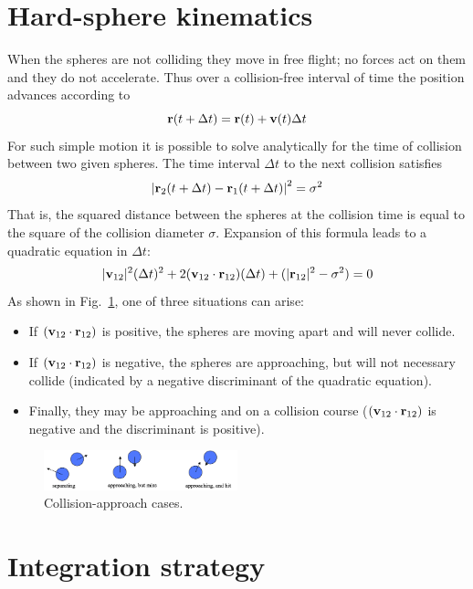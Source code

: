 \documentclass[9pt,bestpractices]{molsim}
\begin{document}
\section{Hard-sphere kinematics}\label{hard-sphere-kinematics}

When the spheres are not colliding they move in free flight; no forces
act on them and they do not accelerate. Thus over a collision-free
interval of time the position advances according to
\[{\bf{r}}(t + \Delta t) = {\bf{r}}(t) + {\bf{v}}(t)\Delta t\]
For such simple motion it is possible to solve analytically for the time
of collision between two given spheres. The time interval $\Delta t$ to the next
collision satisfies
\[{\left| {{{\bf{r}}_2}(t + \Delta t) - {{\bf{r}}_1}(t + \Delta t)} \right|^2} = {\sigma ^2}\]
That is, the squared distance between the spheres at the collision time
is equal to the square of the collision diameter $\sigma$.
Expansion of this formula leads to
a quadratic equation in $\Delta t$:
\[|{{\bf{v}}_{12}}{|^2}{(\Delta t)^2} + 2({{\bf{v}}_{12}} \cdot {{\bf{r}}_{12}})(\Delta t) + (|{{\bf{r}}_{12}}{|^2} - {\sigma ^2}) = 0\]
As shown in Fig.~\ref{fig:approaches}, one of three situations can arise:

\begin{itemize}
\item If $({\bf v}_{12}\cdot {\bf r}_{12})$ is positive, the spheres are moving apart and will never collide. 
\item If $({\bf v}_{12}\cdot {\bf r}_{12})$ is negative, the spheres are approaching, but will not necessary collide
(indicated by a negative discriminant of the quadratic equation).
\item Finally, they may be approaching and on a collision course ($({\bf v}_{12}\cdot {\bf r}_{12})$ is negative
and the discriminant is positive).
\end{itemize}

\begin{figure}
  \centering
  \includegraphics[width=0.5\textwidth]{HSMD_figures/image030}
  \caption{\label{fig:approaches}Collision-approach cases.}
\end{figure}


\section{Integration strategy}\label{integration-strategy}
\end{document}
